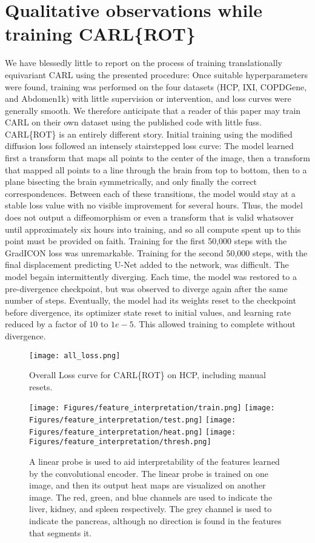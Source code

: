 \section{Qualitative observations while training CARL\{ROT\}}
We have blessedly little to report on the process of training translationally equivariant CARL using the presented procedure: Once suitable hyperparameters were found, training was performed on the four datasets (HCP, IXI, COPDGene, and Abdomen1k) with little supervision or intervention, and loss curves were generally smooth. We therefore anticipate that a reader of this paper may train CARL on their own dataset using the published code with little fuss. CARL\{ROT\} is an entirely different story. Initial training using the modified diffusion loss followed an intensely stairstepped loss curve: The model learned first a transform that maps all points to the center of the image, then a transform that mapped all points to a line through the brain from top to bottom, then to a plane bisecting the brain symmetrically, and only finally the correct correspondences. Between each of these transitions, the model would stay at a stable loss value with no visible improvement for several hours. Thus, the model does not output a diffeomorphism or even a transform that is valid whatsover until approximately six hours into training, and so all compute spent up to this point must be provided on faith. Training for the first 50,000 steps with the GradICON loss was unremarkable. Training for the second 50,000 steps, with the final displacement predicting U-Net added to the network, was difficult. The model begain intermittently diverging. Each time, the model was restored to a pre-divergence checkpoint, but was observed to diverge again after the same number of steps. Eventually, the model had its weights reset to the checkpoint before divergence, its optimizer state reset to initial values, and learning rate reduced by a factor of $10$ to $1e-5$. This allowed training to complete without divergence.
\begin{figure*}
    \texttt{[image: all\_loss.png]}
    \caption{Overall Loss curve for CARL\{ROT\} on HCP, including manual resets.}
\end{figure*}
\fi
\begin{figure}
    \centering
    \texttt{[image: Figures/feature\_interpretation/train.png]}
    \texttt{[image: Figures/feature\_interpretation/test.png]}
    \texttt{[image: Figures/feature\_interpretation/heat.png]}
    \texttt{[image: Figures/feature\_interpretation/thresh.png]}
    \caption{A linear probe is used to aid interpretability of the features learned by the convolutional encoder. The linear probe is trained on one image, and then its output heat maps are visualized on another image. The red, green, and blue channels are used to indicate the liver, kidney, and spleen respectively. The grey channel is used to indicate the pancreas, although no direction is found in the features that segments it.}
    \label{fig:linear_probe_interpretability}
\end{figure}
